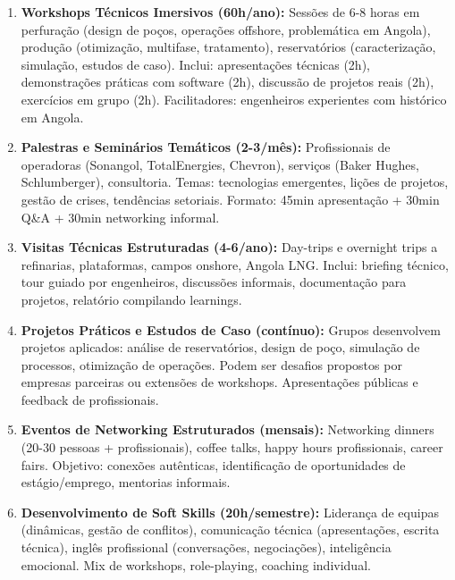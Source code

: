 \documentclass[12pt,a4paper]{article}
\begin{document}
\begin{enumerate}[itemsep=0.25cm]
    \item \textbf{Workshops Técnicos Imersivos (60h/ano):} Sessões de 6-8 horas em perfuração (design de poços, operações offshore, problemática em Angola), produção (otimização, multifase, tratamento), reservatórios (caracterização, simulação, estudos de caso). Inclui: apresentações técnicas (2h), demonstrações práticas com software (2h), discussão de projetos reais (2h), exercícios em grupo (2h). Facilitadores: engenheiros experientes com histórico em Angola.
    
    \item \textbf{Palestras e Seminários Temáticos (2-3/mês):} Profissionais de operadoras (Sonangol, TotalEnergies, Chevron), serviços (Baker Hughes, Schlumberger), consultoria. Temas: tecnologias emergentes, lições de projetos, gestão de crises, tendências setoriais. Formato: 45min apresentação + 30min Q\&A + 30min networking informal.
    
    \item \textbf{Visitas Técnicas Estruturadas (4-6/ano):} Day-trips e overnight trips a refinarias, plataformas, campos onshore, Angola LNG. Inclui: briefing técnico, tour guiado por engenheiros, discussões informais, documentação para projetos, relatório compilando learnings.
    
    \item \textbf{Projetos Práticos e Estudos de Caso (contínuo):} Grupos desenvolvem projetos aplicados: análise de reservatórios, design de poço, simulação de processos, otimização de operações. Podem ser desafios propostos por empresas parceiras ou extensões de workshops. Apresentações públicas e feedback de profissionais.
    
    \item \textbf{Eventos de Networking Estruturados (mensais):} Networking dinners (20-30 pessoas + profissionais), coffee talks, happy hours profissionais, career fairs. Objetivo: conexões autênticas, identificação de oportunidades de estágio/emprego, mentorias informais.
    
    \item \textbf{Desenvolvimento de Soft Skills (20h/semestre):} Liderança de equipas (dinâmicas, gestão de conflitos), comunicação técnica (apresentações, escrita técnica), inglês profissional (conversações, negociações), inteligência emocional. Mix de workshops, role-playing, coaching individual.
\end{enumerate}
\end{document}
